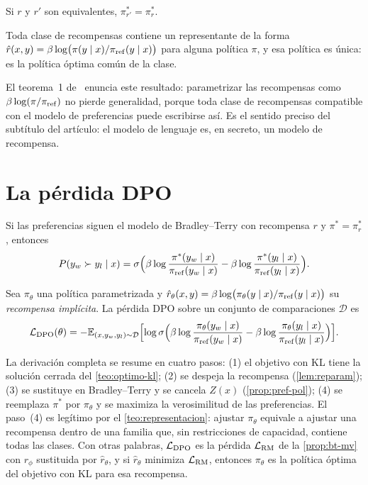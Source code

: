 \begin{lema}\label{lem:equiv-pol}
Si $r$ y $r'$ son equivalentes, $\pi_{r'}^{*}=\pi_r^{*}$.
\end{lema}

\begin{teorema}\label{teo:representacion}
Toda clase de recompensas contiene un representante de la forma $\hat r(x,y)=\beta\log\bigl(\pi(y\mid x)/\pi_{\mathrm{ref}}(y\mid x)\bigr)$ para alguna política $\pi$, y esa política es única: es la política óptima común de la clase.
\end{teorema}

El teorema~1 de~\cite{dpo} enuncia este resultado: parametrizar las recompensas como $\beta\log(\pi/\pi_{\mathrm{ref}})$ no pierde generalidad, porque toda clase de recompensas compatible con el modelo de preferencias puede escribirse así. Es el sentido preciso del subtítulo del artículo: el modelo de lenguaje es, en secreto, un modelo de recompensa.

\section{La pérdida DPO}

\begin{proposicion}\label{prop:pref-pol}
Si las preferencias siguen el modelo de Bradley--Terry con recompensa $r$ y $\pi^{*}=\pi^{*}_r$, entonces
\[
P(y_w\succ y_l\mid x)=\sigma\Bigl(\beta\log\frac{\pi^{*}(y_w\mid x)}{\pi_{\mathrm{ref}}(y_w\mid x)}-\beta\log\frac{\pi^{*}(y_l\mid x)}{\pi_{\mathrm{ref}}(y_l\mid x)}\Bigr).
\]
\end{proposicion}

\begin{definicion}\label{def:dpo}
Sea $\pi_\theta$ una política parametrizada y $\hat r_\theta(x,y)=\beta\log\bigl(\pi_\theta(y\mid x)/\pi_{\mathrm{ref}}(y\mid x)\bigr)$ su \emph{recompensa implícita}. La pérdida DPO sobre un conjunto de comparaciones $\mathcal{D}$ es
\[
\mathcal{L}_{\mathrm{DPO}}(\theta)=-\mathbb{E}_{(x,y_w,y_l)\sim\mathcal{D}}\Bigl[\log\sigma\Bigl(\beta\log\frac{\pi_\theta(y_w\mid x)}{\pi_{\mathrm{ref}}(y_w\mid x)}-\beta\log\frac{\pi_\theta(y_l\mid x)}{\pi_{\mathrm{ref}}(y_l\mid x)}\Bigr)\Bigr].
\]
\end{definicion}

La derivación completa se resume en cuatro pasos: (1) el objetivo con KL tiene la solución cerrada del \cref{teo:optimo-kl}; (2) se despeja la recompensa (\cref{lem:reparam}); (3) se sustituye en Bradley--Terry y se cancela $Z(x)$ (\cref{prop:pref-pol}); (4) se reemplaza $\pi^{*}$ por $\pi_\theta$ y se maximiza la verosimilitud de las preferencias. El paso~(4) es legítimo por el \cref{teo:representacion}: ajustar $\pi_\theta$ equivale a ajustar una recompensa dentro de una familia que, sin restricciones de capacidad, contiene todas las clases. Con otras palabras, $\mathcal{L}_{\mathrm{DPO}}$ es la pérdida $\mathcal{L}_{\mathrm{RM}}$ de la \cref{prop:bt-mv} con $r_\phi$ sustituida por $\hat r_\theta$, y si $\hat r_\theta$ minimiza $\mathcal{L}_{\mathrm{RM}}$, entonces $\pi_\theta$ es la política óptima del objetivo con KL para esa recompensa.

